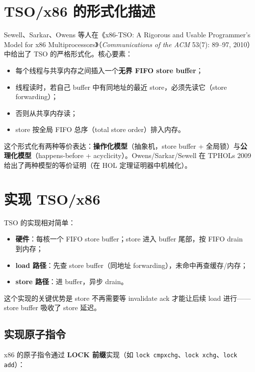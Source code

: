 \section{TSO/x86 的形式化描述}

Sewell、Sarkar、Owens 等人在《x86-TSO: A Rigorous and Usable Programmer's Model for x86 Multiprocessors》（\emph{Communications of the ACM} 53(7): 89–97, 2010）中给出了 TSO 的严格形式化。核心要素：

\begin{itemize}
\item 每个线程与共享内存之间插入一个\textbf{无界 FIFO store buffer}；
\item 线程读时，若自己 buffer 中有同地址的最近 store，必须先读它（store forwarding）；
\item 否则从共享内存读；
\item store 按全局 FIFO 总序（total store order）排入内存。
\end{itemize}


这个形式化有两种等价表达：\textbf{操作化模型}（抽象机，store buffer + 全局锁）与\textbf{公理化模型}（happens-before + acyclicity）。Owens/Sarkar/Sewell 在 TPHOLs 2009 给出了两种模型的等价证明（在 HOL 定理证明器中机械化）。

\section{实现 TSO/x86}

TSO 的实现相对简单：

\begin{itemize}
\item \textbf{硬件}：每核一个 FIFO store buffer；store 进入 buffer 尾部，按 FIFO drain 到内存；
\item \textbf{load 路径}：先查 store buffer（同地址 forwarding），未命中再查缓存/内存；
\item \textbf{store 路径}：进 buffer，异步 drain。
\end{itemize}


这个实现的关键优势是 store 不再需要等 invalidate ack 才能让后续 load 进行——store buffer 吸收了 store 延迟。

\subsection{实现原子指令}

x86 的原子指令通过 \textbf{LOCK 前缀}实现（如 \texttt{lock cmpxchg}、\texttt{lock xchg}、\texttt{lock add}）：

